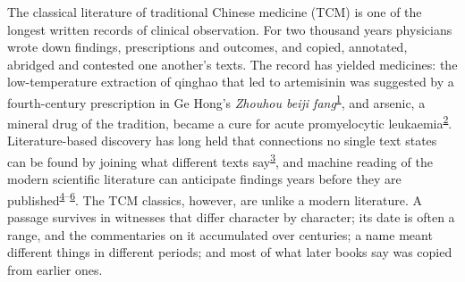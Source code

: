 \documentclass[
]{article}
\begin{document}
The classical literature of traditional Chinese medicine (TCM) is one of
the longest written records of clinical observation. For two thousand
years physicians wrote down findings, prescriptions and outcomes, and
copied, annotated, abridged and contested one another's texts. The
record has yielded medicines: the low-temperature extraction of qinghao
that led to artemisinin was suggested by a fourth-century prescription
in Ge Hong's \emph{Zhouhou beiji
fang}\textsuperscript{\protect\hyperlink{ref-tu2011artemisinin}{1}}, and
arsenic, a mineral drug of the tradition, became a cure for acute
promyelocytic
leukaemia\textsuperscript{\protect\hyperlink{ref-wang2008apl}{2}}.
Literature-based discovery has long held that connections no single text
states can be found by joining what different texts
say\textsuperscript{\protect\hyperlink{ref-swanson1986fish}{3}}, and
machine reading of the modern scientific literature can anticipate
findings years before they are
published\textsuperscript{\protect\hyperlink{ref-tshitoyan2019unsupervised}{4}--\protect\hyperlink{ref-krenn2023forecasting}{6}}.
The TCM classics, however, are unlike a modern literature. A passage
survives in witnesses that differ character by character; its date is
often a range, and the commentaries on it accumulated over centuries; a
name meant different things in different periods; and most of what later
books say was copied from earlier ones.
\end{document}
